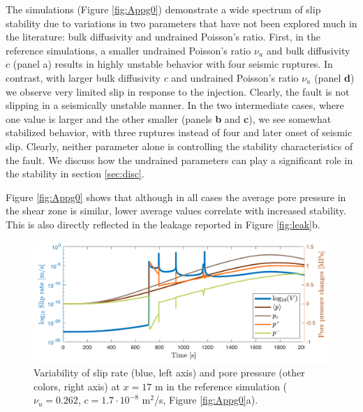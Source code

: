 \documentclass[draft]{agujournal2019}
\begin{document}
The simulations (Figure \ref{fig:Appg0}) demonstrate a wide spectrum of slip stability due to variations in two parameters that have not been explored much in the literature: bulk diffusivity and undrained Poisson's ratio. First, in the reference simulations, a smaller undrained Poisson's ratio $\nu_u$ and bulk diffusivity $c$ (panel a) results in highly unstable behavior with four seismic ruptures.  In contrast, with larger bulk diffusivity $c$ and undrained Poisson's ratio $\nu_u$ (panel {\bf d}) we observe very limited slip in response to the injection. Clearly, the fault is not slipping in a seismically unstable manner.  In the two intermediate cases, where one value is larger and the other smaller (panels {\bf b} and {\bf c}), we see somewhat stabilized behavior, with three ruptures instead of four and later onset of seismic slip. Clearly, neither parameter alone is controlling the stability characteristics of the fault. We discuss how the undrained parameters can play a significant role in the stability in section \ref{sec:disc}.

Figure \ref{fig:Appg0} shows that although in all cases the average pore pressure in the shear zone is similar, lower average values correlate with increased stability. This is also directly reflected in the leakage reported in Figure \ref{fig:leak}b. 

\begin{figure}[H]
\centering
\includegraphics[scale =  0.85]{Figures/logV_and_pressure_atpoint.pdf} %
\caption{Variability of slip rate (blue, left axis) and pore pressure (other colors, right axis) at $x = 17$ m in the reference simulation ($\nu_u = 0.262$, $c = 1.7 \cdot 10^{-8}$ m$^2$/s, Figure \ref{fig:Appg0}a).  }
\label{fig:Vandpatpoint}
\end{figure}
\end{document}
